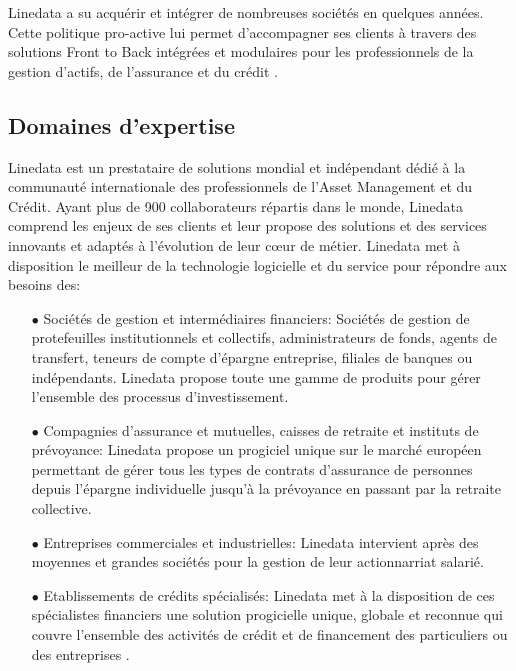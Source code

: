 Linedata a su acquérir et intégrer de nombreuses sociétés en quelques années. Cette politique pro-active lui permet d'accompagner ses clients à travers des solutions Front to Back intégrées et modulaires pour les professionnels de la gestion d'actifs, de l'assurance et du crédit \cite{LinedataHistoire}.
\subsection{Domaines d'expertise}
Linedata est un prestataire de solutions mondial et indépendant dédié à la communauté internationale des professionnels de l'Asset Management et du Crédit. Ayant plus de 900 collaborateurs répartis dans le monde, Linedata comprend les enjeux de ses clients et leur propose des solutions et des services innovants et adaptés à l'évolution de leur cœur de métier. Linedata met à disposition le meilleur de la technologie logicielle et du service pour répondre aux besoins des:\\
\begin{itemize}
    \item[$\bullet$] Sociétés de gestion et intermédiaires financiers: Sociétés de gestion de protefeuilles institutionnels et collectifs, administrateurs de fonds, agents de transfert, teneurs de compte d'épargne entreprise, filiales de banques ou indépendants. Linedata propose toute une gamme de produits pour gérer l'ensemble des processus d'investissement.\\
    \item[$\bullet$] Compagnies d'assurance et mutuelles, caisses de retraite et instituts de prévoyance: Linedata propose un progiciel unique sur le marché européen permettant de gérer tous les types de contrats d'assurance de personnes depuis l'épargne individuelle jusqu'à la prévoyance en passant par la retraite collective.\\
    \item[$\bullet$] Entreprises commerciales et industrielles: Linedata intervient après des moyennes et grandes sociétés pour la gestion de leur actionnarriat salarié.\\
    \item[$\bullet$] Etablissements de crédits spécialisés: Linedata met à la disposition de ces spécialistes financiers une solution progicielle unique, globale et reconnue qui couvre l'ensemble des activités de crédit et de financement des particuliers ou des entreprises \cite{LinedataSolutions}.\\
\end{itemize}
